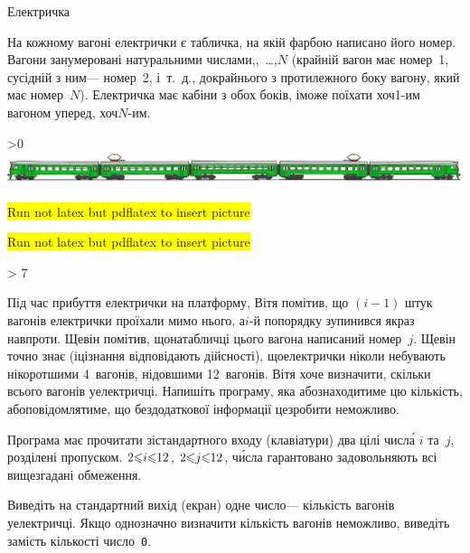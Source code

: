 \documentclass[14pt,a4paper]{extarticle}
\begin{document}
\begin{problemAllDefault}{Електричка}

На кожному вагоні електрички є табличка, на якій фарбою написано його номер. Вагони занумеровані натуральними числами,,~\dots,\nolinebreak[2] $N$ (крайній вагон має номер~1, сусідній з ним\nolinebreak[3] --- номер~2, і~т.~д., до\nolinebreak[3] крайнього з протилежного боку вагону, який має номер~$N$). Електричка має кабіни з обох боків, і\nolinebreak[3] може поїхати хоч\nolinebreak[2] \mbox{1-им} вагоном уперед, хоч\nolinebreak[3] \mbox{$N$-им}.

\ifnum\pdfoutput>0
\includegraphics[width=\textwidth,keepaspectratio=true]{elTrain.png}
\else
\begin{tiny}\colorbox{yellow}{Run not latex but pdflatex to insert picture}\par\end{tiny}
\begin{small}\colorbox{yellow}{Run not latex but pdflatex to insert picture}\end{small}
\ifnum\number\month > 7 \ERROR {}\fi
\fi

Під час прибуття електрички на платформу, Вітя помітив, що ${(i{-}1)}$ штук вагонів електрички проїхали мимо нього, а\nolinebreak[2] \mbox{$i$-й} по\nolinebreak[2] порядку зупинився якраз навпроти. Ще\nolinebreak[2] він помітив, що\nolinebreak[2] на\nolinebreak[2] табличці цього вагона написаний номер~$j$. Ще\nolinebreak[2] він точно знає (і\nolinebreak[2] ці\nolinebreak[2] знання відповідають дійсності), що\nolinebreak[2] електрички ніколи не\nolinebreak[3] бувають ні\nolinebreak[3] коротшими 4~вагонів, ні\nolinebreak[3] довшими 12~вагонів. Вітя хоче визначити, скільки всього вагонів у\nolinebreak[2] електричці. Напишіть програму, яка або\nolinebreak[2] знаходитиме цю кількість, або\nolinebreak[2] повідомлятиме, що без\nolinebreak[1] додаткової інформації це\nolinebreak[1] зробити неможливо.

\InputFile
Програма має прочитати зі\nolinebreak[3] стандартного входу (клавіатури) два цілі числ\'{а} $i$ та~$j$, розділені пропуском. ${2{\leqslant}i{\leqslant}12}$, ${2{\leqslant}j{\leqslant}12}$, ч\'{и}сла гарантовано задовольняють всі вищезгадані обмеження.

\OutputFile
Виведіть на стандартний вихід (екран) одне число\nolinebreak[3] --- кількість вагонів у\nolinebreak[3] електричці. Якщо однозначно визначити кількість вагонів неможливо, виведіть замість кількості число~\texttt{0}.

\Example
\begin{exampleSimple}{3em}{3em}%
%
\end{exampleSimple}

\end{problemAllDefault}
	
\end{document}
